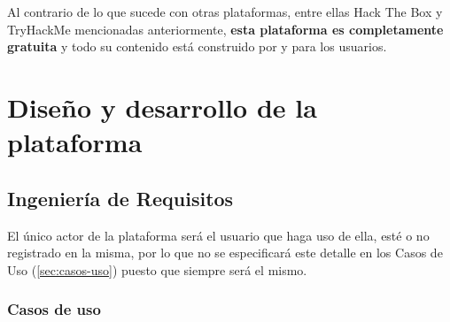     Al contrario de lo que sucede con otras plataformas, entre ellas Hack The Box y TryHackMe mencionadas anteriormente, \textbf{esta plataforma es completamente gratuita} y todo su contenido está construido por y para los usuarios.
    
    \cleardoublepage
    
    

\chapter{Diseño y desarrollo de la plataforma}
    
    \section{Ingeniería de Requisitos}
        \label{cha:ingenieria-requisitos}
        
        
        
        El único actor de la plataforma será el usuario que haga uso de ella, esté o no registrado en la misma, por lo que no se especificará este detalle en los Casos de Uso (\autoref{sec:casos-uso}) puesto que siempre será el mismo.
        
        
        \subsection{Casos de uso}
            \label{sec:casos-uso}
            
